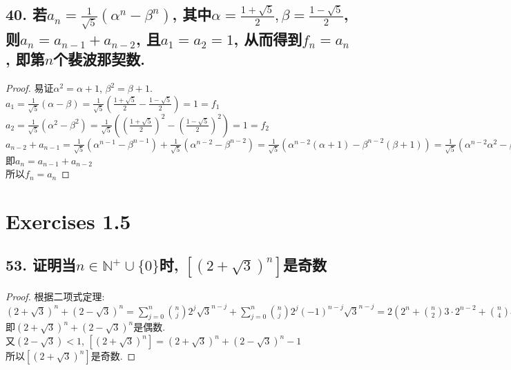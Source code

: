 \documentclass[UTF8, onecolumn, a4paper]{article}
\begin{document}
\subsection*{40. 若$a_n = \frac{1}{\sqrt{5}}(\alpha^n - \beta^n)$, 其中$\alpha = \frac{1+\sqrt{5}}{2}, \beta = \frac{1-\sqrt{5}}{2}$, 则$a_n = a_{n-1} + a_{n-2}$, 且$a_1 = a_2 = 1$, 从而得到$f_n = a_n$, 即第$n$个裴波那契数.}
\begin{proof}
易证$\alpha^2 = \alpha+1$, $\beta^2 = \beta + 1$.\\
$a_1 = \frac{1}{\sqrt{5}}(\alpha - \beta) = \frac{1}{\sqrt{5}}\left(\frac{1+\sqrt{5}}{2} - \frac{1-\sqrt{5}}{2}\right) = 1 = f_1$\\
$a_2 = \frac{1}{\sqrt{5}}(\alpha^2 - \beta^2) = \frac{1}{\sqrt{5}}\left((\frac{1+\sqrt{5}}{2})^2 - (\frac{1-\sqrt{5}}{2})^2\right) = 1 = f_2$\\
$a_{n-2} + a_{n-1} = \frac{1}{\sqrt{5}} \left(\alpha^{n-1} - \beta^{n-1}\right)+\frac{1}{\sqrt{5}}\left(\alpha^{n-2} - \beta^{n-2}\right)= \frac{1}{\sqrt{5}}\left(\alpha^{n-2}(\alpha+1) - \beta^{n-2}(\beta+1)\right) = \frac{1}{\sqrt{5}}\left(\alpha^{n-2}\alpha^2 - \beta^{n-2}\beta^2\right) = \frac{1}{\sqrt{5}}\left(\alpha^n - \beta^n\right) = a_n$\\
即$a_n = a_{n-1} + a_{n-2}$\\
所以$f_n = a_n$
\end{proof}

\section*{Exercises 1.5}
\subsection*{53. 证明当$n\in \mathbb{N^+}\cup\{0\}$时, $\left[(2 + \sqrt{3})^n\right]$是奇数}
\begin{proof}
根据二项式定理:
$(2 + \sqrt{3})^n + (2 - \sqrt{3})^n = \sum_{j=0}^{n}\binom{n}{j}2^j\sqrt{3}^{n-j} + \sum_{j=0}^{n}\binom{n}{j}2^j(-1)^{n-j}\sqrt{3}^{n-j} = 2(2^n + \binom{n}{2}3\cdot 2^{n-2} + \binom{n}{4}3^2\cdot2^{n-4} + \cdots) = 2l, l\in \mathbb{Z}$\\
即$(2 + \sqrt{3})^n + (2 - \sqrt{3})^n$是偶数.\\
又$(2 - \sqrt{3}) < 1$, $\left[(2 + \sqrt{3})^n\right] = (2 + \sqrt{3})^n + (2 - \sqrt{3})^n - 1$\\
所以$\left[(2 + \sqrt{3})^n\right]$是奇数.
\end{proof}
\end{document}
